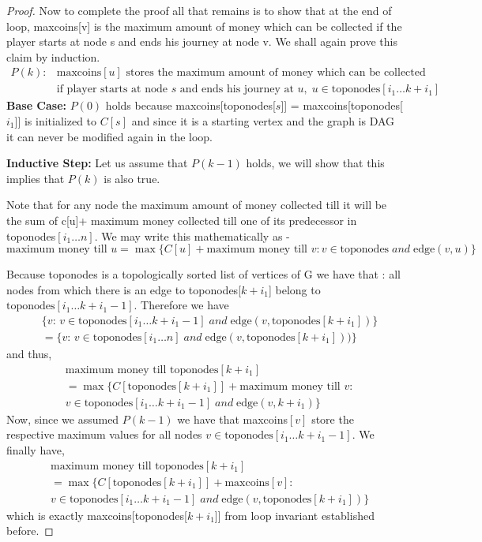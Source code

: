 \documentclass[answers]{exam}
\begin{document}
\begin{questions}
\begin{parts}
\begin{solution}
\begin{proof}
Now to complete the proof all that remains is to show that at the end of loop, maxcoins[v] is the maximum amount of money which can be collected if the player starts at node s and ends his journey at node v.  We shall again prove this claim by induction.
\begin{align*}
    P(k):& \text{maxcoins}[u] \text{ stores the maximum amount of money which can be collected} \\
         & \text{if player starts at node $s$ and ends his journey at $u$},\; u \in \text{toponodes}[i_{1}\ldots k+i_{1}]
\end{align*}
\textbf{Base Case:} $P(0)$ holds because maxcoins[toponodes[$s$]] = maxcoins[toponodes[$i_{1}$]] is initialized to $C[s]$ and since it is a starting vertex and the graph is DAG it can never be modified again in the loop.

\textbf{Inductive Step:} Let us assume that $P(k-1)$ holds, we will show that this implies that $P(k)$ is also true.

Note that for any node the maximum amount of money collected till it will be the sum of c[u]+ maximum money collected till one of its predecessor in toponodes$[i_1 \ldots n]$. We may write this mathematically as -
\[
    \text{maximum money till }u = \max\{C[u] + \text{maximum money till }v : v \in \text{toponodes} \;and\; \text{edge}(v,u)\}
\]

Because toponodes is a topologically sorted list of vertices of G we have that : all nodes from which there is an edge to toponodes[$k+i_{1}$] belong to $\text{toponodes}[i_{1}\ldots k+i_{1}-1]$. Therefore we have
\begin{align*}
    &\{v:\, v \in \text{toponodes}[i_{1}\ldots k+i_{1}-1] \;and\; \text{edge}(v,\text{toponodes}[k+i_1])\} \\ & =
    \{v:\, v \in \text{toponodes}[i_1\ldots n] \;and\; \text{edge}(v,\text{toponodes}[k+i_1]))\}
\end{align*}
and thus,
\begin{align*}
    &\text{maximum money till toponodes}[k+i_{1}] \\&= \max\{C[\text{toponodes}[k+i_{1}]]+\text{maximum money till }v :\\&
                                v \in \text{toponodes}[i_{1}\ldots k+i_{1}-1] \;and\; \text{edge}(v,k+i_{1})\}
\end{align*}
Now, since we assumed $P(k-1)$ we have that maxcoins$[v]$ store the respective maximum values for all nodes $v \in \text{toponodes}[i_{1}\ldots k+i_{1}-1]$. We finally have,
\begin{align*}
    &\text{maximum money till toponodes}[k+i_{1}] \\&= \max\{C[\text{toponodes}[k+i_{1}]]+ \text{maxcoins}[v] :
                                            \\&v \in \text{toponodes}[i_{1}\ldots k+i_{1}-1] \;and\; \text{edge}(v,\text{toponodes}[k+i_{1}])\}
\end{align*}
which is exactly maxcoins[toponodes[$k+i_{1}$]] from loop invariant established before.


\end{proof}
\end{solution}
\end{parts}
\end{questions}
\end{document}
